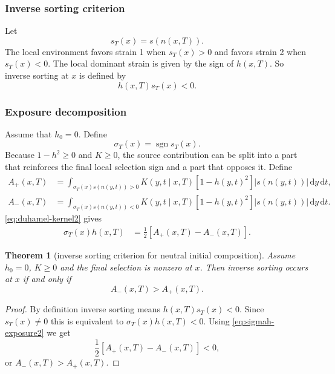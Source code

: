 \documentclass[11pt,a4paper]{report}
\newtheorem{theorem}{Theorem}
\newcommand{\dd}{\,\mathrm d}
\newcommand{\sgn}{\operatorname{sgn}}
\begin{document}
	\subsubsection{Inverse sorting criterion}
	Let
	\begin{equation}
		s_T(x)=s(n(x,T)).
	\end{equation}
	The local environment favors strain 1 when \(s_T(x)>0\) and favors strain 2 when \(s_T(x)<0\). The local dominant strain is given by the sign of \(h(x,T)\). So inverse sorting at \(x\) is defined by
	\begin{equation}
		{
			h(x,T)s_T(x)<0.
		}
		\label{eq:inverse-def}
	\end{equation}
	
	\subsubsection{Exposure decomposition}
	Assume that \(h_0=0\). Define
	\begin{equation}
		\sigma_T(x)=\sgn s_T(x).
	\end{equation}
	Because \(1-h^2\geq0\) and \(K\geq0\), the source contribution can be split into a part that reinforces the final local selection sign and a part that opposes it.  Define
	\begin{align}
		A_+(x,T)&=\int_{\sigma_T(x)s(n(y,t))>0}
		K(y,t\mid x,T)[1-h(y,t)^2]|s(n(y,t))|\dd y\dd t,
		\label{eq:Aplus}\\
		A_-(x,T)&=\int_{\sigma_T(x)s(n(y,t))<0}
		K(y,t\mid x,T)[1-h(y,t)^2]|s(n(y,t))|\dd y\dd t.
		\label{eq:Aminus}
	\end{align}
	\eqref{eq:duhamel-kernel2} gives
	\begin{align}
		\sigma_T(x)h(x,T)
		&=\frac12\left[A_+(x,T)-A_-(x,T)\right].
		\label{eq:sigmah-exposure2}
	\end{align}
	\begin{theorem}[inverse sorting criterion for neutral initial composition]
		Assume \(h_0=0\), \(K\geq0\) and the final selection is nonzero at \(x\). Then inverse sorting occurs at \(x\) if and only if
		\begin{equation}
			{A_-(x,T)>A_+(x,T).}
			\label{eq:exposure-criterion2}
		\end{equation}
	\end{theorem}	
	\begin{proof}
		By definition inverse sorting means \(h(x,T)s_T(x)<0\). Since \(s_T(x)\neq0\) this is equivalent to \(\sigma_T(x)h(x,T)<0\). Using \cref{eq:sigmah-exposure2} we get
		\begin{equation}
			\frac12[A_+(x,T)-A_-(x,T)]<0,
		\end{equation}
		or \(A_-(x,T)>A_+(x,T)\).
	\end{proof}
\end{document}
